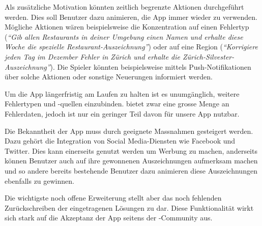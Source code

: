 Als zusätzliche Motivation könnten zeitlich begrenzte Aktionen durchgeführt werden.
Dies soll Benutzer dazu animieren, die App immer wieder zu verwenden. 
Mögliche Aktionen wären beispielsweise die Konzentration auf einen Fehlertyp (\emph{"`Gib allen Restaurants in deiner Umgebung einen Namen und erhalte diese Woche die spezielle Restaurant-Auszeichnung"'}) oder auf eine Region (\emph{"`Korrigiere jeden Tag im Dezember Fehler in Zürich und erhalte die Zürich-Silvester-Auszeichnung"'}).
Die Spieler könnten beispielsweise mittels Push-Notifikationen über solche Aktionen oder sonstige Neuerungen informiert werden.

Um die App längerfristig am Laufen zu halten ist es unumgänglich, weitere Fehlertypen und -quellen einzubinden. 
 bietet zwar eine grosse Menge an Fehlerdaten, jedoch ist nur ein geringer Teil davon für unsere App nutzbar.

Die Bekanntheit der App muss durch geeignete Massnahmen gesteigert werden. Dazu gehört die Integration von Social Media-Diensten wie Facebook und Twitter.
Dies kann einerseits genutzt werden um Werbung zu machen, anderseits können Benutzer auch auf ihre gewonnenen Auszeichnungen aufmerksam machen und so andere bereits bestehende Benutzer dazu animieren diese Auszeichnungen ebenfalls zu gewinnen.

Die wichtigste noch offene Erweiterung stellt aber das noch fehlenden Zurückschreiben der eingetragenen Lösungen zu  dar.
Diese Funktionalität wirkt sich stark auf die Akzeptanz der App seitens der -Community aus.